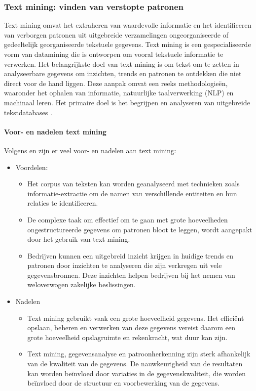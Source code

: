 \subsubsection{Text mining: vinden van verstopte patronen}
Text mining omvat het extraheren van waardevolle informatie en het identificeren van verborgen patronen uit uitgebreide verzamelingen ongeorganiseerde of gedeeltelijk georganiseerde tekstuele gegevens. Text mining is een gespecialiseerde vorm van datamining die is ontworpen om vooral tekstuele informatie te verwerken. Het belangrijkste doel van text mining is om tekst om te zetten in analyseerbare gegevens om inzichten, trends en patronen te ontdekken die niet direct voor de hand liggen. Deze aanpak omvat een reeks methodologieën, waaronder het ophalen van informatie, natuurlijke taalverwerking (NLP) en machinaal leren. Het primaire doel is het begrijpen en analyseren van uitgebreide tekstdatabases \autocite{gaikwad2014text}.

\paragraph{Voor- en nadelen text mining}
Volgens \autocite{Kinter2024} en \autocite{gaikwad2014text} zijn er veel voor- en nadelen aan text mining:
\begin{itemize}
    \item Voordelen:
  \begin{itemize}
    \item Het corpus van teksten kan worden geanalyseerd met technieken zoals informatie-extractie om de namen van verschillende entiteiten en hun relaties te identificeren. 
    \item De complexe taak om effectief om te gaan met grote hoeveelheden ongestructureerde gegevens om patronen bloot te leggen, wordt aangepakt door het gebruik van text mining.
    \item Bedrijven kunnen een uitgebreid inzicht krijgen in huidige trends en patronen door inzichten te analyseren die zijn verkregen uit vele gegevensbronnen. Deze inzichten helpen bedrijven bij het nemen van weloverwogen zakelijke beslissingen.

  \end{itemize}
  \item Nadelen
  \begin{itemize}
    \item Text mining gebruikt vaak een grote hoeveelheid gegevens. Het efficiënt opslaan, beheren en verwerken van deze gegevens vereist daarom een grote hoeveelheid opslagruimte en rekenkracht, wat duur kan zijn.
    \item Text mining, gegevensanalyse en patroonherkenning zijn sterk afhankelijk van de kwaliteit van de gegevens. De nauwkeurigheid van de resultaten kan worden beïnvloed door variaties in de gegevenskwaliteit, die worden beïnvloed door de structuur en voorbewerking van de gegevens.
  \end{itemize}
\end{itemize}

